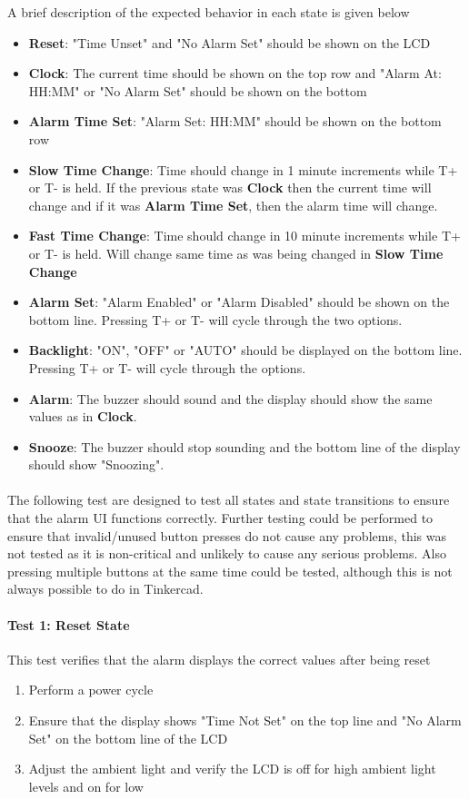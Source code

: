 \documentclass{article}
\begin{document}
A brief description of the expected behavior in each state is given below
\begin{itemize}
    \item \textbf{Reset}: "Time Unset" and "No Alarm Set" should be shown on the LCD
    \item \textbf{Clock}: The current time should be shown on the top row and "Alarm At: HH:MM" or "No Alarm Set" should be shown on the bottom
    \item \textbf{Alarm Time Set}: "Alarm Set: HH:MM" should be shown on the bottom row
    \item \textbf{Slow Time Change}: Time should change in 1 minute increments while T+ or T- is held. If the previous state was \textbf{Clock} then the current time will change and if it was \textbf{Alarm Time Set}, then the alarm time will change.
    \item \textbf{Fast Time Change}: Time should change in 10 minute increments while T+ or T- is held. Will change same time as was being changed in \textbf{Slow Time Change}
    \item \textbf{Alarm Set}: "Alarm Enabled" or "Alarm Disabled" should be shown on the bottom line. Pressing T+ or T- will cycle through the two options.
    \item \textbf{Backlight}: "ON", "OFF" or "AUTO" should be displayed on the bottom line. Pressing T+ or T- will cycle through the options.
    \item \textbf{Alarm}: The buzzer should sound and the display should show the same values as in \textbf{Clock}.
    \item \textbf{Snooze}: The buzzer should stop sounding and the bottom line of the display should show "Snoozing".
\end{itemize}

\paragraph{}
The following test are designed to test all states and state transitions to ensure that the alarm UI functions correctly. Further testing could be performed to ensure that invalid/unused button presses do not cause any problems, this was not tested as it is non-critical and unlikely to cause any serious problems. Also pressing multiple buttons at the same time could be tested, although this is not always possible to do in Tinkercad.

\paragraph{Test 1: Reset State}  This test verifies that the alarm displays the correct values after being reset
\begin{enumerate}
    \item Perform a power cycle
    \item Ensure that the display shows "Time Not Set" on the top line and "No Alarm Set" on the bottom line of the LCD
    \item Adjust the ambient light and verify the LCD is off for high ambient light levels and on for low
\end{enumerate}
\end{document}
